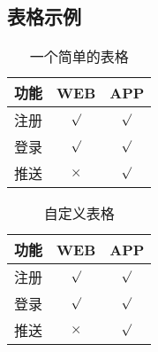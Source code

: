 \documentclass[a4paper,11pt,UTF8,AutoFakeBold= {2.88}]{ctexart}
\begin{document}
\begin{appendix}
\clearpage

\section{表格示例}

\begin{table}[!h!tbp]
\caption{一个简单的表格}\label{tab1}
  \centering
  \begin{tabular}{|l|c|c|}
	\hline
	功能          &WEB         &APP         \\ \hline
	注册          &$\surd$     &$\surd$     \\ \hline
	登录          &$\surd$     &$\surd$     \\ \hline
	推送          &$\times$    &$\surd$     \\ \hline
\end{tabular}
\end{table}

\begin{table}[!h!tbp]
\caption{自定义表格}\label{tab2}
  \centering
\begin{tabular*}{0.75\textwidth}{@{\extracolsep{\fill}}lcc}
    \toprule
    功能          &WEB         &APP         \\
    \midrule
    注册          &$\surd$     &$\surd$     \\
    登录          &$\surd$     &$\surd$     \\
    推送          &$\times$    &$\surd$     \\
    \bottomrule
\end{tabular*}
\end{table}


\end{appendix}
\end{document}
